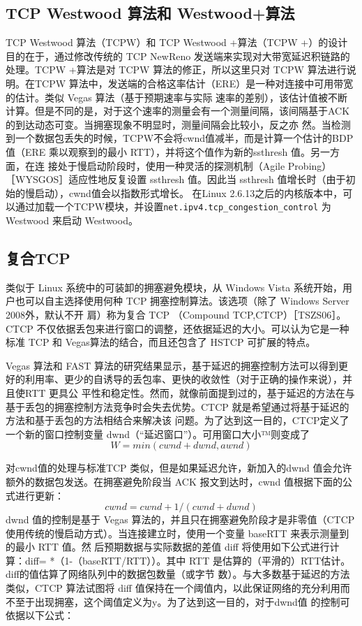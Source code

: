 \subsection{TCP Westwood 算法和 Westwood+算法}
TCP Westwood 算法（TCPW）和 TCP Westwood +算法（TCPW +）的设计目的在于，通过修改传统的 TCP NewReno 发送端来实现对大带宽延迟积链路的处理。TCPW +算法是对
TCPW 算法的修正，所以这里只对 TCPW 算法进行说明。在TCPW 算法中，发送端的合格这率估计（ERE）是一种对连接中可用带宽的估计。类似 Vegas 算法（基于预期速率与实际
速率的差别），该估计值被不断计算。但是不同的是，对于这个速率的测量会有一个测量间隔，该间隔基于ACK 的到达动态可变。当拥塞现象不明显时，测量间隔会比较小，反之亦
然。当检测到一个数据包丢失的时候，TCPW不会将cwnd值减半，而是计算一个估计的BDP 值（ERE 乘以观察到的最小 RTT），并将这个值作为新的ssthresh 值。另一方面，在连
接处于慢启动阶段时，使用一种灵活的探测机制（Agile Probing）［WYSGOS］适应性地反复设置 ssthresh 值。因此当 ssthresh 值增长时（由于初始的慢启动），cwnd值会以指数形式增长。
在Linux 2.6.13之后的内核版本中，可以通过加载一个TCPW模块，并设置\verb|net.ipv4.tcp_congestion_control| 为 Westwood 来启动 Westwood。

\subsection{复合TCP}
类似于 Linux 系统中的可装卸的拥塞避免模块，从 Windows Vista 系统开始，用户也可以自主选择使用何种 TCP 拥塞控制算法。该选项（除了 Windows Server 2008外，默认不开
肩）称为复合 TCP （Compound TCP,CTCP）［TSZS06］。CTCP 不仅依据丢包来进行窗口的调整，还依据延迟的大小。可以认为它是一种标准 TCP 和 Vegas算法的结合，而且还包含了
HSTCP 可扩展的特点。

Vegas 算法和 FAST 算法的研究结果显示，基于延迟的拥塞控制方法可以得到更好的利用率、更少的自诱导的丢包率、更快的收敛性（对于正确的操作来说），并且使RTT 更具公
平性和稳定性。然而，就像前面提到过的，基于延迟的方法在与基于丢包的拥塞控制方法竞争时会失去优势。CTCP 就是希望通过将基于延迟的方法和基于丢包的方法相结合来解决该
问题。为了达到这一目的，CTCP定义了一个新的窗口控制变量 dwnd（“延迟窗口”）。可用窗口大小™则变成了
\begin{equation}
    W = min (cwnd + dwnd, awnd)
\end{equation}

对cwnd值的处理与标准TCP 类似，但是如果延迟允许，新加入的dwnd 值会允许额外的数据包发送。在拥塞避免阶段当 ACK 报文到达时，cwnd 值根据下面的公式进行更新：
\begin{equation}
    cwnd = cwnd + 1/ (cwnd + dwnd)
\end{equation}
dwnd 值的控制是基于 Vegas 算法的，并且只在拥塞避免阶段才是非零值（CTCP 使用传统的慢启动方式）。当连接建立时，使用一个变量 baseRTT 来表示测量到的最小 RTT 值。然
后预期数据与实际数据的差值 diff 将使用如下公式进行计算：diff= *（1-（baseRTT/RTT））。其中 RTT 是估算的（平滑的）RTT估计。diff的值估算了网络队列中的数据包数量（或字节
数）。与大多数基于延迟的方法类似，CTCP 算法试图将 diff 值保持在一个阈值内，以此保证网络的充分利用而不至于出现拥塞，这个阈值定义为y。为了达到这一目的，对于dwnd值
的控制可依据以下公式：

